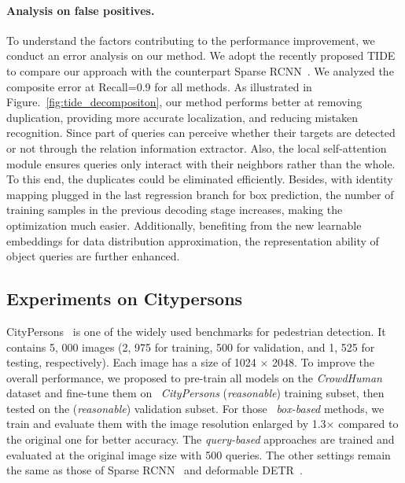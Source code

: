 \documentclass[final]{cvpr}
\begin{document}
\vspace{-0.5cm}
\paragraph{Analysis on false positives.}
To understand the factors contributing to the performance improvement, we conduct an error analysis on our method. We adopt the recently proposed TIDE~\cite{tide-eccv2020} to compare our approach with the counterpart Sparse RCNN~\cite{sun2020sparse}. We analyzed the composite error at Recall=0.9 for all methods. As illustrated in Figure.~\ref{fig:tide_decompositon}, our method performs better at removing duplication, providing more accurate localization, and reducing mistaken recognition. Since part of queries can perceive whether their targets are detected or not through the relation information extractor. Also, the local self-attention module ensures queries only interact with their neighbors rather than the whole. To this end, the duplicates could be eliminated efficiently. Besides, with identity mapping plugged in the last regression branch for box prediction, the number of training samples in the previous decoding stage increases, making the optimization much easier. Additionally, benefiting from the new learnable embeddings for data distribution approximation, the representation ability of object queries are further enhanced.

\vspace{-0.2cm}
\subsection{Experiments on Citypersons}

CityPersons~\cite{zhang2017citypersons} is one of the widely used benchmarks for pedestrian detection. It contains 5, 000 images (2, 975 for training, 500 for validation, and 1, 525 for testing, respectively). Each image has a size of 1024 $\times$ 2048. To improve the overall performance, we proposed to pre-train all models on the \emph{CrowdHuman} dataset and fine-tune them on ~\emph{CityPersons} (\emph{reasonable}) training subset, then tested on the (\emph{reasonable}) validation subset. For those ~\emph{box-based} methods, we train and evaluate them with the image resolution enlarged by 1.3$\times$ compared to the original one for better accuracy. The \emph{query-based} approaches are trained and evaluated at the original image size with 500 queries. The other settings remain the same as those of Sparse RCNN~\cite{sun2020sparse} and deformable DETR~\cite{zhu2021deformable}.
\end{document}
